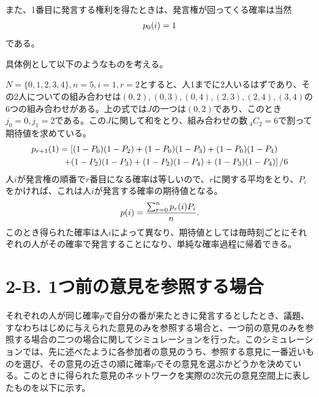 \documentclass[letterpaper,10pt,english]{sphinxmanual}
\begin{document}
また、1番目に発言する権利を得たときは、発言権が回ってくる確率は当然
\begin{gather}
\begin{split}p_{0}(i) = 1\end{split}\notag
\end{gather}
である。

具体例として以下のようなものを考える。

\(N=\{0,1,2,3,4\}, n = 5, i = 1, r = 2\)とすると、人1までに2人いるはずであり、その2人についての組み合わせは\((0,2), (0,3), (0,4), (2,3), (2,4), (3,4)\)の6つの組み合わせがある。上の式では\(J\)の一つは\((0, 2)\)であり、このとき\(j_{0} = 0, j_{1} = 2\)である。この\(J\)に関して和をとり、組み合わせの数\(\ _{4}C_{2} = 6\)で割って期待値を求めている。
\begin{gather}
\begin{split}\begin{align}
p_{r+1}(1) &= \left[(1-P_{0})(1-P_{2}) + (1-P_{0})(1-P_{3}) + (1-P_{0})(1-P_{4}) \right.\\
&\ \left. + (1-P_{2})(1-P_{3}) + (1-P_{2})(1-P_{4}) + (1-P_{3})(1-P_{4}) \right]/6
\end{align}\end{split}\notag
\end{gather}
人\(i\)が発言権の順番で\(r\)番目になる確率は等しいので、\(r\)に関する平均をとり、\(P_{i}\)をかければ、これは人\(i\)が発言する確率の期待値となる。
\begin{gather}
\begin{split}p(i) = \frac{\sum_{r=0}^{n}p_{r}(i)P_{i}}{n}.\end{split}\notag
\end{gather}
このとき得られた確率は人\(i\)によって異なり、期待値としては毎時刻ごとにそれぞれの人がその確率で発言することになり、単純な確率過程に帰着できる。


\section{2-B. 1つ前の意見を参照する場合}
\label{draft:b-1}
それぞれの人が同じ確率\(p\)で自分の番が来たときに発言するとしたとき、議題、すなわちはじめに与えられた意見のみを参照する場合と、一つ前の意見のみを参照する場合の二つの場合に関してシミュレーションを行った。このシミュレーションでは、先に述べたように各参加者の意見のうち、参照する意見に一番近いものを選び、その意見の近さの順に確率\(p\)でその意見を選ぶかどうかを決めている。このときに得られた意見のネットワークを実際の2次元の意見空間上に表したものを以下に示す。
\end{document}

